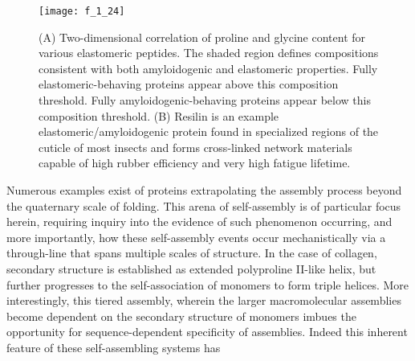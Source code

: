 \begin{refsection}
\begin{figure}[h!] \centering \texttt{[image: f\_1\_24]}
    \caption[(A) Two-dimensional correlation of proline and glycine content for
    various elastomeric peptides. The shaded region defines compositions
consistent with both amyloidogenic and elastomeric properties. Fully
elastomeric-behaving proteins appear above this composition threshold. Fully
amyloidogenic-behaving proteins appear below this composition threshold. (B)
Resilin is an example elastomeric/amyloidogenic protein found in specialized
regions of the cuticle of most insects and forms cross-linked network materials
capable of high rubber efficiency and very high fatigue lifetime.]
    {(A) Two-dimensional correlation of proline and glycine content for various
    elastomeric peptides. The shaded region defines compositions consistent with
    both amyloidogenic and elastomeric properties. Fully elastomeric-behaving
    proteins appear above this composition threshold. Fully
    amyloidogenic-behaving proteins appear below this composition
    threshold.\cite{Rauscher2006} (B) Resilin is an example
    elastomeric/amyloidogenic protein found in specialized regions of the
    cuticle of most insects and forms cross-linked network materials capable of
    high rubber efficiency and very high fatigue lifetime.\cite{Elvin2005}}
    \label{fig:resilin} \end{figure}
Numerous examples exist of proteins extrapolating the assembly process beyond
the quaternary scale of folding. This arena of self-assembly is of particular
focus herein, requiring inquiry into the evidence of such phenomenon occurring,
and more importantly, how these self-assembly events occur mechanistically via a
through-line that spans multiple scales of structure. In the case of collagen,
secondary structure is established as extended polyproline II-like helix, but
further progresses to the self-association of monomers to form triple
helices.\cite{Jones1991} More interestingly, this tiered assembly, wherein the
larger macromolecular assemblies become dependent on the secondary structure of
monomers imbues the opportunity for sequence-dependent specificity of
assemblies. Indeed this inherent feature of these self-assembling systems has

\end{refsection}
